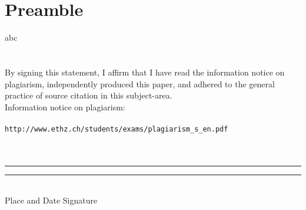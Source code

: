 \chapter*{Preamble}
abc\\
\\
\\
By signing this statement, I affirm that I have read the information notice on plagiarism, independently produced this paper, and adhered to the general practice of source citation in this subject-area.
\\
Information notice on plagiarism:
\\
\\
\verb"http://www.ethz.ch/students/exams/plagiarism_s_en.pdf"
\\
\\
\\
\begin{tabbing}
\noindent\rule{4cm}{0.4pt} \hspace{1cm} \noindent\rule{5cm}{0.4pt}
\\
Place and Date \hspace{2.5cm}Signature
\end{tabbing} 